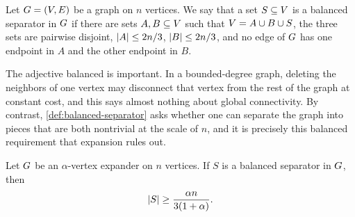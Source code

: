 \begin{definition}
	\label{def:balanced-separator}
	Let \(G=(V,E)\) be a graph on \(n\) vertices. We say that a set \(S\subseteq V\) is a balanced separator in \(G\) if there are sets \(A,B\subseteq V\) such that \(V=A\cup B\cup S\), the three sets are pairwise disjoint, \(\lvert A\rvert\leq 2n/3\), \(\lvert B\rvert\leq 2n/3\), and no edge of \(G\) has one endpoint in \(A\) and the other endpoint in \(B\).
\end{definition}

The adjective balanced is important. In a bounded-degree graph, deleting the neighbors of one vertex may disconnect that vertex from the rest of the graph at constant cost, and this says almost nothing about global connectivity. By contrast, \cref{def:balanced-separator} asks whether one can separate the graph into pieces that are both nontrivial at the scale of \(n\), and it is precisely this balanced requirement that expansion rules out.

\begin{proposition}
	\label{prop:expanders-have-linear-separators}
	Let \(G\) be an \(\alpha\)-vertex expander on \(n\) vertices. If \(S\) is a balanced separator in \(G\), then
	\begin{equation}
		\label{eq:separator-size-lower-bound}
		\lvert S\rvert\geq \frac{\alpha n}{3(1+\alpha)}.
	\end{equation}
\end{proposition}

